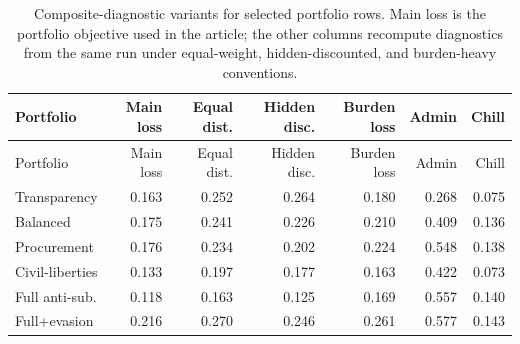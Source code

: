 \begingroup
\scriptsize
\setlength{\tabcolsep}{2pt}
\begin{longtable}{lrrrrrr}
\caption{Composite-diagnostic variants for selected portfolio rows. Main loss is the portfolio objective used in the article; the other columns recompute diagnostics from the same run under equal-weight, hidden-discounted, and burden-heavy conventions.}\label{tab:diagnostic-variant-snapshot}\\
\toprule
Portfolio & Main loss & Equal dist. & Hidden disc. & Burden loss & Admin & Chill \\
\midrule
\endfirsthead
\toprule
Portfolio & Main loss & Equal dist. & Hidden disc. & Burden loss & Admin & Chill \\
\midrule
\endhead
Transparency & 0.163 & 0.252 & 0.264 & 0.180 & 0.268 & 0.075 \\
Balanced & 0.175 & 0.241 & 0.226 & 0.210 & 0.409 & 0.136 \\
Procurement & 0.176 & 0.234 & 0.202 & 0.224 & 0.548 & 0.138 \\
Civil-liberties & 0.133 & 0.197 & 0.177 & 0.163 & 0.422 & 0.073 \\
Full anti-sub. & 0.118 & 0.163 & 0.125 & 0.169 & 0.557 & 0.140 \\
Full+evasion & 0.216 & 0.270 & 0.246 & 0.261 & 0.577 & 0.143 \\
\bottomrule
\end{longtable}
\endgroup
